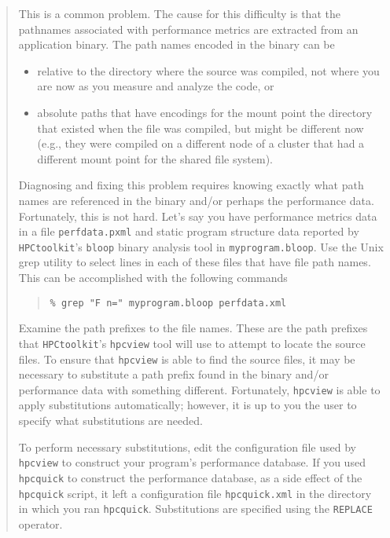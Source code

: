 \documentclass{article}
\begin{document}
\begin{quote}
This is a common problem. The cause for this difficulty is that the
pathnames associated with performance metrics are extracted from an
application binary. The path names encoded in the binary can be

\begin{itemize}
   \item relative to the directory where the source was compiled, not
         where you are now as you measure and analyze the code, or

   \item absolute paths that have encodings for the mount point the
         directory that existed when the file was compiled, but might be
         different now (e.g., they were compiled on a different node of a
         cluster that had a different mount point for the shared file
         system).
\end{itemize}


Diagnosing and fixing this problem requires knowing exactly what path
names are referenced in the binary and/or perhaps the performance
data. Fortunately, this is not hard. Let’s say you have performance
metrics data in a file \verb|perfdata.pxml| and static program structure data
reported by \verb|HPCtoolkit|'s \verb|bloop| binary analysis tool in
\verb|myprogram.bloop|. Use the Unix grep utility to select lines in each of
these files that have file path names. This can be accomplished with
the following commands
\begin{quote}
   \verb|% grep "F n=" myprogram.bloop perfdata.xml|
\end{quote}

Examine the path prefixes to the file names. These are the path
prefixes that \verb|HPCtoolkit|'s \verb|hpcview| tool will use to
attempt to locate the source files. To ensure that \verb|hpcview| is able to
find the source files, it may be necessary to substitute a path prefix
found in the binary and/or performance data with something different.
Fortunately, \verb|hpcview| is able to apply substitutions automatically;
however, it is up to you the user to specify what substitutions are
needed.

To perform necessary substitutions, edit the configuration file used
by \verb|hpcview| to construct your program’s performance database. If
you used \verb|hpcquick| to construct the performance database, as a
side effect of the \verb|hpcquick| script, it left a configuration
file \verb|hpcquick.xml| in the directory in which you ran \verb|hpcquick|.
Substitutions are specified using the \verb|REPLACE| operator.


\end{quote}
\end{document}

